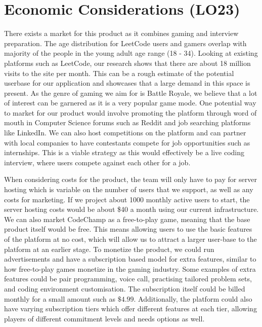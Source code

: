 \documentclass[12pt, titlepage]{article}
\begin{document}
\section{Economic Considerations (LO23)}

There exists a market for this product as it combines gaming and interview preparation. The age distribution for LeetCode users and gamers overlap with majority of the people in the young adult age range (18 - 34). Looking at existing platforms such as LeetCode, our research shows that there are about 18 million visits to the site per month. This can be a rough estimate of the potential userbase for our application and showcases that a large demand in this space is present. As the genre of gaming we aim for is Battle Royale, we believe that a lot of interest can be garnered as it is a very popular game mode. One potential way to market for our product would involve promoting the platform through word of mouth in Computer Science forums such as Reddit and job searching platforms like LinkedIn. We can also host competitions on the platform and can partner with local companies to have contestants compete for job opportunities such as internships. This is a viable strategy as this would effectively be a live coding interview, where users compete against each other for a job.

When considering costs for the product, the team will only have to pay for server hosting which is variable on the number of users that we support, as well as any costs for marketing. If we project about 1000 monthly active users to start, the server hosting costs would be about \$40 a month using our current infrastructure. We can also market CodeChamp as a free-to-play game, meaning that the base product itself would be free. This means allowing users to use the basic features of the platform at no cost, which will allow us to attract a larger user-base to the platform at an earlier stage. To monetize the product, we could run advertisements and have a subscription based model for extra features, similar to how free-to-play games monetize in the gaming industry. Some examples of extra features could be pair programming, voice call, practising tailored problem sets, and coding environment customisation. The subscription itself could be billed monthly for a small amount such as $\$4.99$. Additionally, the platform could also have varying subscription tiers which offer different features at each tier, allowing players of different commitment levels and needs options as well.
\end{document}
